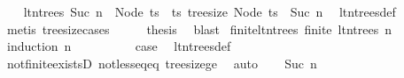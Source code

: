 \begin{isabellebody}
%
\isadelimproof
%
\endisadelimproof
%
\isatagproof
{}\isamarkupfalse%
{\isacharminus}{\kern0pt}\isanewline
\ \ \isamarkupfalse%
\ {\isachardoublequoteopen}lt{\isacharunderscore}{\kern0pt}n{\isacharunderscore}{\kern0pt}trees\ {\isacharparenleft}{\kern0pt}Suc\ n{\isacharparenright}{\kern0pt}\ {\isacharequal}{\kern0pt}\ {\isacharbraceleft}{\kern0pt}Node\ ts\ {\isacharbar}{\kern0pt}\ ts{\isachardot}{\kern0pt}\ tree{\isacharunderscore}{\kern0pt}size\ {\isacharparenleft}{\kern0pt}Node\ ts{\isacharparenright}{\kern0pt}\ {\isasymle}\ Suc\ n{\isacharbraceright}{\kern0pt}{\isachardoublequoteclose}\ \isamarkupfalse%
\ lt{\isacharunderscore}{\kern0pt}n{\isacharunderscore}{\kern0pt}trees{\isacharunderscore}{\kern0pt}def\ \isamarkupfalse%
\ {\isacharparenleft}{\kern0pt}metis\ tree{\isacharunderscore}{\kern0pt}size{\isachardot}{\kern0pt}cases{\isacharparenright}{\kern0pt}\isanewline
\ \ \isamarkupfalse%
\ \isamarkupfalse%
\ {\isacharquery}{\kern0pt}thesis\ \isamarkupfalse%
\ blast\isanewline
{}\isamarkupfalse%
%
\endisatagproof
{\isafoldproof}%
%
\isadelimproof
\isanewline
%
\endisadelimproof
\isanewline
{}\isamarkupfalse%
\ finite{\isacharunderscore}{\kern0pt}lt{\isacharunderscore}{\kern0pt}n{\isacharunderscore}{\kern0pt}trees{\isacharcolon}{\kern0pt}\ {\isachardoublequoteopen}finite\ {\isacharparenleft}{\kern0pt}lt{\isacharunderscore}{\kern0pt}n{\isacharunderscore}{\kern0pt}trees\ n{\isacharparenright}{\kern0pt}{\isachardoublequoteclose}\isanewline
%
\isadelimproof
%
\endisadelimproof
%
\isatagproof
{}\isamarkupfalse%
\ {\isacharparenleft}{\kern0pt}induction\ n{\isacharparenright}{\kern0pt}\isanewline
\ \ \isamarkupfalse%
\ {}\isanewline
\ \ \isamarkupfalse%
\ \isamarkupfalse%
\ {\isacharquery}{\kern0pt}case\ \isamarkupfalse%
\ lt{\isacharunderscore}{\kern0pt}n{\isacharunderscore}{\kern0pt}trees{\isacharunderscore}{\kern0pt}def\ \isamarkupfalse%
\ not{\isacharunderscore}{\kern0pt}finite{\isacharunderscore}{\kern0pt}existsD\ not{\isacharunderscore}{\kern0pt}less{\isacharunderscore}{\kern0pt}eq{\isacharunderscore}{\kern0pt}eq\ tree{\isacharunderscore}{\kern0pt}size{\isacharunderscore}{\kern0pt}ge{\isacharunderscore}{\kern0pt}{}\ \isamarkupfalse%
\ auto\isanewline
{}\isamarkupfalse%
\isanewline
\ \ \isamarkupfalse%
\ {\isacharparenleft}{\kern0pt}Suc\ n{\isacharparenright}{\kern0pt}\isanewline

\end{isabellebody}
